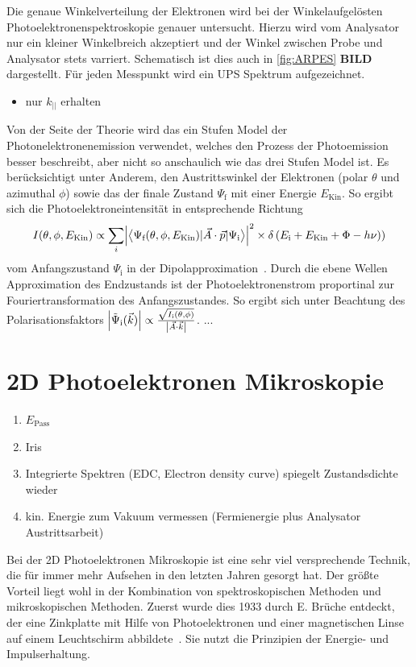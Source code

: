             Die genaue Winkelverteilung der Elektronen wird bei der Winkelaufgelösten Photoelektronenspektroskopie genauer untersucht.
            Hierzu wird vom Analysator nur ein kleiner Winkelbreich akzeptiert und der Winkel zwischen Probe und Analysator stets varriert.
            Schematisch ist dies auch in \autoref{fig:ARPES} \textbf{BILD} dargestellt.
            Für jeden Messpunkt wird ein UPS Spektrum aufgezeichnet.
            \begin{itemize}
                \item nur $k_{||}$ erhalten
            \end{itemize}

            Von der Seite der Theorie wird das ein Stufen Model der Photonelektronenemission verwendet, welches den Prozess der Photoemission besser beschreibt, aber nicht so anschaulich wie das drei Stufen Model ist.
            Es berücksichtigt unter Anderem, den Austrittswinkel der Elektronen (polar $\theta$ und azimuthal $\phi$) sowie das der finale Zustand $\Psi_\text{f}$ mit einer Energie $E_\text{Kin}$.
            So ergibt sich die Photoelektroneintensität in entsprechende Richtung 
            \begin{equation}
                I(\theta, \phi, E_\text{Kin}) \propto \sum_i \abs*{\bigl<\Psi_\text{f}(\theta, \phi, E_\text{Kin})|\vec{A}\cdot\vec{p}|\Psi_\text{i}\bigr>}^2 \times \delta\left(E_\text{i}+E_\text{Kin}+\Phi-h\nu\right))
            \end{equation}
            vom Anfangszustand $\Psi_\text{i}$ in der Dipolapproximation~\cite{MM_2}.
            Durch die ebene Wellen Approximation des Endzustands ist der Photoelektronenstrom proportinal zur Fouriertransformation des Anfangszustandes.
            So ergibt sich unter Beachtung des Polarisationsfaktors $\abs*{\tilde{\Psi}_\text{i}(\vec{k})} \propto \frac{\sqrt{I_\text{i}(\theta, \phi)}}{\abs*{\vec{A}\cdot\vec{k}}}$.
            ...

    \section{2D Photoelektronen Mikroskopie} \label{sec:2D-PES}
        \begin{enumerate}
            \item $E_\text{Pass}$
            \item Iris
            \item Integrierte Spektren (EDC, Electron density curve) spiegelt Zustandsdichte wieder
            \item kin. Energie zum Vakuum vermessen (Fermienergie plus Analysator Austrittsarbeit)
        \end{enumerate}
        Bei der 2D Photoelektronen Mikroskopie ist eine sehr viel versprechende Technik, die für immer mehr Aufsehen in den letzten Jahren gesorgt hat.
        Der größte Vorteil liegt wohl in der Kombination von spektroskopischen Methoden und mikroskopischen Methoden.
        Zuerst wurde dies 1933 durch E. Brüche entdeckt, der eine Zinkplatte mit Hilfe von Photoelektronen und einer magnetischen Linse auf einem Leuchtschirm abbildete~\cite{bruche_elektronenmikroskopische_1933}.
        Sie nutzt die Prinzipien der Energie- und Impulserhaltung.

